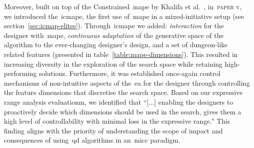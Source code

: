 Moreover, built on top of the Constrained~\acrshort{mape} by Khalifa et al.~\cite{Khalifa2018}, in~\textsc{paper v}, we introduced the~\acrlong{icmape}, the first use of~\acrshort{mape} in a mixed-initiative setup (see section~\ref{sec:icmap-elites}). Through~\acrshort{icmape} we added: \textit{interaction} for the designer with~\acrshort{mape}, \textit{continuous adaptation} of the generative space of the algorithm to the ever-changing designer's design, and a set of dungeon-like related features (presented in table~\ref{table:mape-dimensions}). This resulted in increasing diversity in the exploration of the search space while retaining high-performing solutions. Furthermore, it was established once-again control mechanisms of non-intuitive aspects of the~\acrshort{ea} for the designer through controlling the feature dimensions that discretise the search space. Based on our expressive range analysis evaluationm, we identified that ``[...] enabling the designers to proactively decide which dimensions should be used in the search, gives them a high level of controllability with minimal loss in the expressive range." This finding aligns with the priority of understanding the scope of impact and consequences of using~\acrshort{qd} algorithms in an~\acrshort{micc} paradigm.







